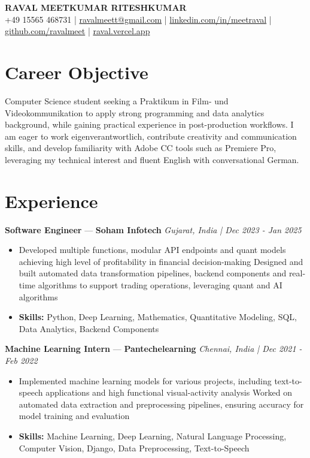 \documentclass[a4paper,10pt]{article}
\begin{document}
\begin{center}
  {\Large\bfseries RAVAL MEETKUMAR RITESHKUMAR}\\[2pt]
  {\small +49 15565 468731 \;|\; \href{mailto:ravalmeett@gmail.com}{ravalmeett@gmail.com} \;|\; \href{https://www.linkedin.com/in/meetraval/}{linkedin.com/in/meetraval} \;|\; \href{https://github.com/ravalmeet}{github.com/ravalmeet} \;|\; \href{https://raval.vercel.app/}{raval.vercel.app}}
\end{center}
\vspace{-3pt}

\section*{Career Objective}
Computer Science student seeking a Praktikum in Film- und Videokommunikation to apply strong programming and data analytics background, while gaining practical experience in post-production workflows. I am eager to work eigenverantwortlich, contribute creativity and communication skills, and develop familiarity with Adobe CC tools such as Premiere Pro, leveraging my technical interest and fluent English with conversational German.\par

\section*{Experience}
\textbf{Software Engineer} — \textbf{Soham Infotech} \hfill \textit{Gujarat, India \;|\; Dec 2023 - Jan 2025}\par
\vspace{1pt}
\begin{itemize}
  \item Developed multiple functions, modular API endpoints and quant models achieving high level of profitability in financial decision-making Designed and built automated data transformation pipelines, backend components and real-time algorithms to support trading operations, leveraging quant and AI algorithms
  \item \textbf{Skills:} Python, Deep Learning, Mathematics, Quantitative Modeling, SQL, Data Analytics, Backend Components
\end{itemize}
\vspace{3pt}
\textbf{Machine Learning Intern} — \textbf{Pantechelearning} \hfill \textit{Chennai, India \;|\; Dec 2021 - Feb 2022}\par
\vspace{1pt}
\begin{itemize}
  \item Implemented machine learning models for various projects, including text-to-speech applications and high functional visual-activity analysis Worked on automated data extraction and preprocessing pipelines, ensuring accuracy for model training and evaluation
  \item \textbf{Skills:} Machine Learning, Deep Learning, Natural Language Processing, Computer Vision, Django, Data Preprocessing, Text-to-Speech
\end{itemize}
\end{document}
